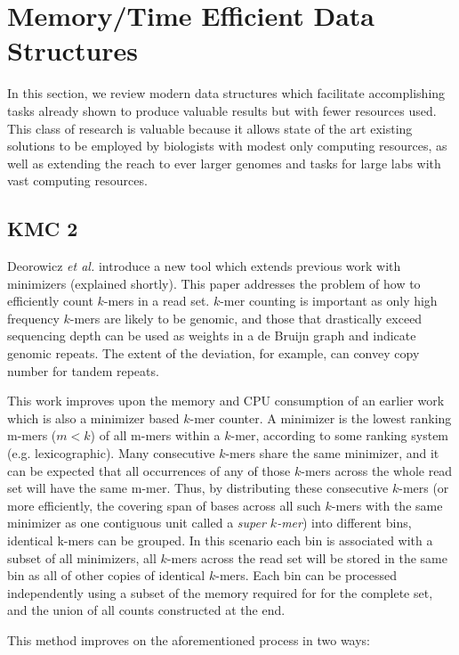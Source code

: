 \section{Memory/Time Efficient Data Structures}

In this section, we review modern data structures which facilitate accomplishing tasks already shown to produce valuable results but with fewer resources used.  This class of research is valuable because it allows state of the art existing solutions to be employed by biologists with modest only computing resources, as well as extending the reach to ever larger genomes and tasks for large labs with vast computing resources.

\subsection{KMC 2}

Deorowicz \emph{et al.} \cite{deorowicz2015kmc} introduce a new tool which extends previous work with minimizers (explained shortly).
This paper addresses the problem of how to efficiently count $k$-mers in a read set.
$k$-mer counting is important as only high frequency $k$-mers are likely to be genomic, and those that drastically exceed sequencing depth can be used as weights in a de Bruijn graph and indicate genomic repeats.  The extent of the deviation, for example, can convey copy number for tandem repeats.

This work improves upon the memory and CPU consumption of an earlier work which is also a minimizer based $k$-mer counter.
A minimizer is the lowest ranking m-mers ($m < k$) of all m-mers within a $k$-mer, according to some ranking system (e.g. lexicographic).  Many consecutive $k$-mers share the same minimizer, and it can be expected that all occurrences of any of those $k$-mers across the whole read set will have the same m-mer.
Thus, by distributing these consecutive $k$-mers (or more efficiently, the covering span of bases across all such $k$-mers with the same minimizer as one contiguous unit called a \emph{super $k$-mer}) into different bins, identical k-mers can be grouped.  In this scenario each bin is associated with a subset of all minimizers, all $k$-mers across the read set will be stored in the same bin as all of other copies of identical $k$-mers.
Each bin can be processed independently using a subset of the memory required for for the complete set, and the union of all counts constructed at the end.

This method improves on the aforementioned process in two ways:

